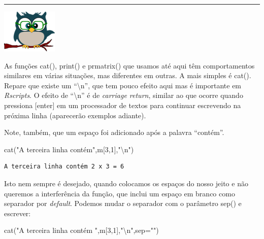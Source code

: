\documentclass[
]{article}
\newenvironment{Shaded}{\begin{snugshade}}{\end{snugshade}}
\newcommand{\AttributeTok}[1]{\textcolor[rgb]{0.77,0.63,0.00}{#1}}
\newcommand{\DecValTok}[1]{\textcolor[rgb]{0.00,0.00,0.81}{#1}}
\newcommand{\FunctionTok}[1]{\textcolor[rgb]{0.00,0.00,0.00}{#1}}
\newcommand{\NormalTok}[1]{#1}
\newcommand{\SpecialCharTok}[1]{\textcolor[rgb]{0.00,0.00,0.00}{#1}}
\newcommand{\StringTok}[1]{\textcolor[rgb]{0.31,0.60,0.02}{#1}}
\begin{document}
\begin{center}\rule{0.5\linewidth}{0.5pt}\end{center}

\begin{flushleft}\includegraphics[width=0.08\linewidth]{coruja} \end{flushleft}

As funções cat(), print() e prmatrix() que usamos até aqui têm
comportamentos similares em várias situações, mas diferentes em outras.
A mais simples é cat(). Repare que existe um ``\textbackslash n'', que
tem pouco efeito aqui mas é importante em \emph{Rscripts}. O efeito de
``\textbackslash n'' é de \emph{carriage return}, similar ao que ocorre
quando pressiona {[}enter{]} em um processador de textos para continuar
escrevendo na próxima linha (aparecerão exemplos adiante).

Note, também, que um espaço foi adicionado após a palavra ``contém''.

\begin{Shaded}
\begin{Highlighting}[]
\FunctionTok{cat}\NormalTok{(}\StringTok{"A terceira linha contém"}\NormalTok{,m[}\DecValTok{3}\NormalTok{,}\DecValTok{1}\NormalTok{],}\StringTok{"}\SpecialCharTok{\textbackslash{}n}\StringTok{"}\NormalTok{)}
\end{Highlighting}
\end{Shaded}

\begin{verbatim}
A terceira linha contém 2 x 3 = 6 
\end{verbatim}

Isto nem sempre é desejado, quando colocamos os espaços do nosso jeito e
não queremos a interferência da função, que inclui um espaço em branco
como separador por \emph{default}. Podemos mudar o separador com o
parâmetro sep() e escrever:

\begin{Shaded}
\begin{Highlighting}[]
\FunctionTok{cat}\NormalTok{(}\StringTok{"A terceira linha contém "}\NormalTok{,m[}\DecValTok{3}\NormalTok{,}\DecValTok{1}\NormalTok{],}\StringTok{"}\SpecialCharTok{\textbackslash{}n}\StringTok{"}\NormalTok{,}\AttributeTok{sep=}\StringTok{""}\NormalTok{)}
\end{Highlighting}
\end{Shaded}
\end{document}
